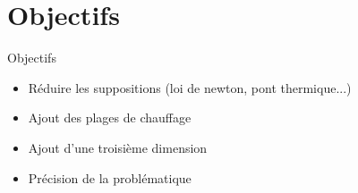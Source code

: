 \documentclass{beamer}
\begin{document}
\section{Objectifs}
\begin{frame}{Objectifs}
    \begin{itemize}
        \item Réduire les suppositions (loi de newton, pont thermique...)
        \item Ajout des plages de chauffage
        \item Ajout d'une troisième dimension
        \item Précision de la problématique
    \end{itemize}
\end{frame}
\end{document}

